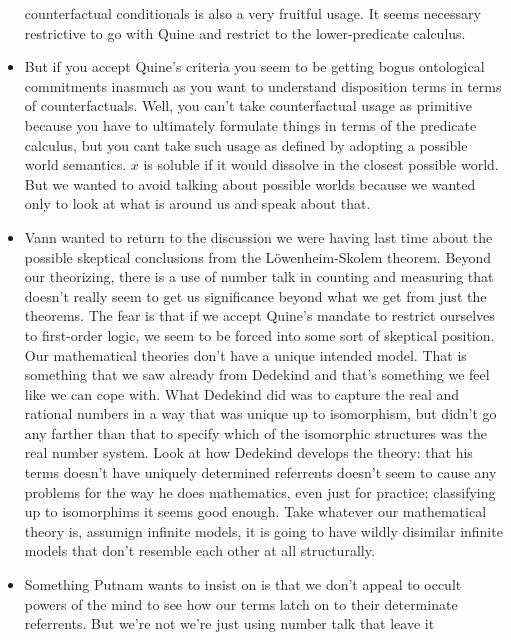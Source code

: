 \documentclass[12pt]{article}
\theoremstyle{definition}
\begin{document}
\begin{itemize}
        counterfactual conditionals is also a very fruitful usage. It seems
        necessary restrictive to go with Quine and restrict to the
        lower-predicate calculus.
    \item
        But if you accept Quine's criteria you seem to be getting bogus
        ontological commitments inasmuch as you want to understand disposition
        terms in terms of counterfactuals. Well, you can't take counterfactual
        usage as primitive because you have to ultimately formulate things in
        terms of the predicate calculus, but you cant take such usage as
        defined by adopting a possible world semantics. $x$ is soluble if it
        would dissolve in the closest possible world. But we wanted to avoid
        talking about possible worlds because we wanted only to look at what is
        around us and speak about that.
    \item
        Vann wanted to return to the discussion we were having last time about
        the possible skeptical conclusions from the L\"owenheim-Skolem theorem.
        Beyond our theorizing, there is a use of number talk in counting and
        measuring that doesn't really seem to get us significance beyond what
        we get from just the theorems. The fear is that if we accept Quine's
        mandate to restrict ourselves to first-order logic, we seem to be
        forced into some sort of skeptical position. Our mathematical theories
        don't have a unique intended model. That is something that we saw
        already from Dedekind and that's something we feel like we can cope
        with. What Dedekind did was to capture the real and rational numbers in
        a way that was unique up to isomorphism, but didn't go any farther than
        that to specify which of the isomorphic structures was the real number
        system. Look at how Dedekind develops the theory: that his terms
        doesn't have uniquely determined referrents doesn't seem to cause any
        problems for the way he does mathematics, even just for practice;
        classifying up to isomorphims it seems good enough. Take whatever our
        mathematical theory is, assumign infinite models, it is going to have
        wildly disimilar infinite models that don't resemble each other at all
        structurally.
    \item
        Something Putnam wants to insist on is that we don't appeal to occult
        powers of the mind to see how our terms latch on to their determinate
        referrents. But we're not we're just using number talk that leave it

\end{itemize}
\end{document}
